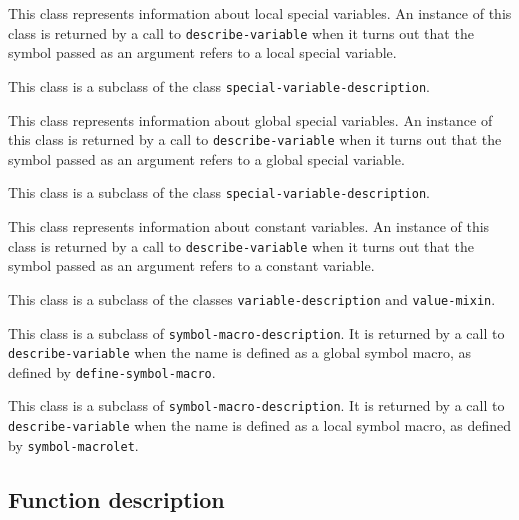 {\footnotesize
{}
}

This class represents information about local special variables.   An
instance of this class is returned by a call to \texttt{describe-variable}
when it turns out that the symbol passed as an argument refers to a
local special variable.

This class is a subclass of the class
\texttt{special-variable-description}.

{\footnotesize
{}
}

This class represents information about global special variables.   An
instance of this class is returned by a call to \texttt{describe-variable}
when it turns out that the symbol passed as an argument refers to a
global special variable.

This class is a subclass of the class
\texttt{special-variable-description}.

{\footnotesize
{}
}

This class represents information about constant variables.   An
instance of this class is returned by a call to \texttt{describe-variable}
when it turns out that the symbol passed as an argument refers to a
constant variable.

This class is a subclass of the classes \texttt{variable-description} and
\texttt{value-mixin}.

{\footnotesize
{}
}

This class is a subclass of \texttt{symbol-macro-description}.  It is
returned by a call to \texttt{describe-variable} when the name is
defined as a global symbol macro, as defined by
\texttt{define-symbol-macro}.

{\footnotesize
{}
}

This class is a subclass of \texttt{symbol-macro-description}.  It is
returned by a call to \texttt{describe-variable} when the
name is defined as a local symbol macro, as defined by
\texttt{symbol-macrolet}.

\subsection{Function description}
\label{sec-instantiable-classes-function-description}

{\footnotesize
{}
}

